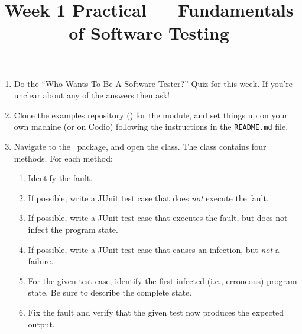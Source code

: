 



\title{Week 1 Practical --- Fundamentals of Software Testing}

\begin{enumerate}

    \item Do the ``Who Wants To Be A Software Tester?'' Quiz for this week.
    If you're unclear about any of the answers then ask!

    \item Clone the examples repository (\examplesrepourl) for the module, and
    set things up on your own machine (or on Codio) following the instructions
    in the {\tt README.md} file.

    \item Navigate to the \examplespackage~package, and open the \weekonepracticalclass
    class. The class contains four methods. For each method:

        \begin{enumerate}

            \item Identify the fault.
            
            \item If possible, write a JUnit test case that does {\it not} execute the fault.
            
            \item If possible, write a JUnit test case that executes the fault, but
            does not infect the program state.

            \item If possible, write a JUnit test case that causes an infection,
            but {\it not} a failure.

            \item For the given test case, identify the first infected
            (i.e., erroneous) program state. Be sure to describe the complete
            state.
            
            \item Fix the fault and verify that the given test now produces the
            expected output.


        \end{enumerate}

\end{enumerate}

